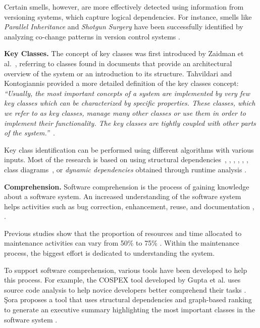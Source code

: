 Certain smells, however, are more effectively detected using information from versioning systems, which capture logical dependencies. For instance, smells like \textit{Parallel Inheritance} and \textit{Shotgun Surgery} have been successfully identified by analyzing co-change patterns in version control systems \cite{6963448}.


\textbf{Key Classes.} The concept of key classes was first introduced by Zaidman et al.\ \cite{ZaidmanJurnal}, referring to classes found in documents that provide an architectural overview of the system or an introduction to its structure. Tahvildari and Kontogiannis provided a more detailed definition of the key classes concept: \textit{“Usually, the most important concepts of a system are implemented by very few key classes which can be characterized by specific properties. These classes, which we refer to as key classes, manage many other classes or use them in order to implement their functionality. The key classes are tightly coupled with other parts of the system.”}~\cite{Tahvildari2004ImprovingDQ}.

Key class identification can be performed using different algorithms with various inputs. Most of the research is based on using structural dependencies~\cite{PagerankENASE}, \cite{enase15}, \cite{PagerankSACI}, \cite{Finding-key-classes}, \cite{ZaidmanJurnal}, \cite{rocclasification}, class diagrams~\cite{6676885}, or \textit{dynamic dependencies} obtained through runtime analysis \cite{ZaidmanJurnal}. 

\textbf{Comprehension.}  
Software comprehension is the process of gaining knowledge about a software system. An increased understanding of the software system helps activities such as bug correction, enhancement, reuse, and documentation \cite{Comprehension}, \cite{1199197}. 

Previous studies show that the proportion of resources and time allocated to maintenance activities can vary from 50\% to 75\% \cite{articleLientz}. Within the maintenance process, the biggest effort is dedicated to understanding the system.

To support software comprehension, various tools have been developed to help this process. For example, the COSPEX tool developed by Gupta et al. uses source code analysis to help novice developers better comprehend their tasks \cite{Comprehension-Gupta}. Şora proposes a tool that uses structural dependencies and graph-based ranking to generate an executive summary highlighting the most important classes in the software system \cite{enase15}.


